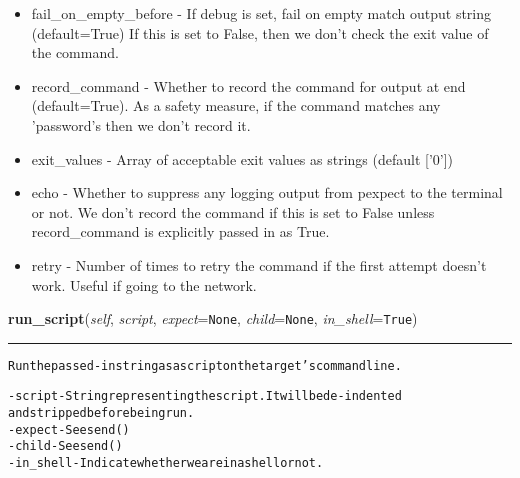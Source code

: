 \begin{boxedminipage}{\funcwidth}
\begin{itemize}
      \item fail\_on\_empty\_before       - If debug is set, fail on empty 
        match output string (default=True) If this is set to False, then we
        don't check the exit value of the command.

      \item record\_command             - Whether to record the command for 
        output at end (default=True). As a safety measure, if the command 
        matches any 'password's then we don't record it.

      \item exit\_values                - Array of acceptable exit values as 
        strings (default ['0'])

      \item echo                       - Whether to suppress any logging output
        from pexpect to the terminal or not. We don't record the command if
        this is set to False unless record\_command is explicitly passed in
        as True.

      \item retry                      - Number of times to retry the command 
        if the first attempt doesn't work. Useful if going to the network.

    \end{itemize}

\setlength{\parskip}{1ex}
    \end{boxedminipage}

    \label{shutit_global:ShutIt:run_script}

    \vspace{0.5ex}

\hspace{.8\funcindent}\begin{boxedminipage}{\funcwidth}

    \raggedright \textbf{run\_script}(\textit{self}, \textit{script}, \textit{expect}={\tt None}, \textit{child}={\tt None}, \textit{in\_shell}={\tt True})

    \vspace{-1.5ex}

    \rule{\textwidth}{0.5\fboxrule}
\setlength{\parskip}{2ex}
\begin{alltt}
Run the passed-in string as a script on the target's command line.

- script   - String representing the script. It will be de-indented
                 and stripped before being run.
- expect   - See send()
- child    - See send()
- in\_shell - Indicate whether we are in a shell or not.
\end{alltt}

\setlength{\parskip}{1ex}
    \end{boxedminipage}

